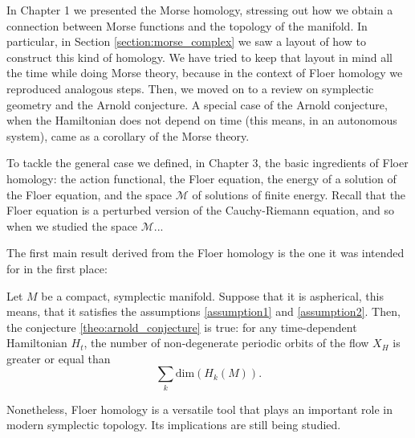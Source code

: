 In Chapter 1 we presented the Morse homology, stressing out how we obtain a connection between Morse functions and the topology of the manifold. In particular, in Section \ref{section:morse_complex} we saw a layout of how to construct this kind of homology. We have tried to keep that layout in mind all the time while doing Morse theory, because in the context of Floer homology we reproduced analogous steps. Then, we moved on to a review on symplectic geometry and the Arnold conjecture. A special case of the Arnold conjecture, when the Hamiltonian does not depend on time (this means, in an autonomous system), came as a corollary of the Morse theory.

To tackle the general case we defined, in Chapter 3, the basic ingredients of Floer homology: the action functional, the Floer equation, the energy of a solution of the Floer equation, and the space $\mathcal{M}$ of solutions of finite energy. Recall that the Floer equation is a perturbed version of the Cauchy-Riemann equation, and so when we studied the space $\mathcal{M}$...

The first main result derived from the Floer homology is the one it was intended for in the first place:

\begin{rmrk}
Let $M$ be a compact, symplectic manifold. Suppose that it is aspherical, this means, that it satisfies the assumptions \ref{assumption1} and \ref{assumption2}. Then, the conjecture \ref{theo:arnold_conjecture} is true: for any time-dependent Hamiltonian $H_t$, the number of non-degenerate periodic orbits of the flow $X_H$ is greater or equal than
\[\sum_k \mathrm{dim}(H_k(M)) .\]
\end{rmrk}

Nonetheless, Floer homology is a versatile tool that plays an important role in modern symplectic topology. Its implications are still being studied.


